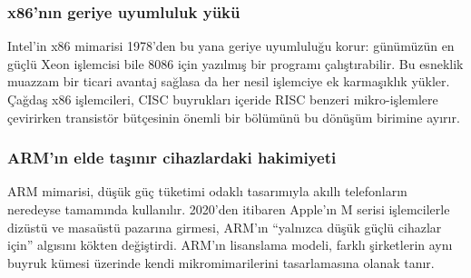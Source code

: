 \subsubsection*{x86'nın geriye uyumluluk yükü}
Intel'in x86 mimarisi 1978'den bu yana geriye uyumluluğu korur: günümüzün en güçlü Xeon işlemcisi bile 8086 için yazılmış bir programı çalıştırabilir. Bu esneklik muazzam bir ticari avantaj sağlasa da her nesil işlemciye ek karmaşıklık yükler. Çağdaş x86 işlemcileri, CISC buyrukları içeride RISC benzeri mikro-işlemlere çevirirken transistör bütçesinin önemli bir bölümünü bu dönüşüm birimine ayırır.

\subsubsection*{ARM'ın elde taşınır cihazlardaki hakimiyeti}
ARM mimarisi, düşük güç tüketimi odaklı tasarımıyla akıllı telefonların neredeyse tamamında kullanılır. 2020'den itibaren Apple'ın M serisi işlemcilerle dizüstü ve masaüstü pazarına girmesi, ARM'ın ``yalnızca düşük güçlü cihazlar için'' algısını kökten değiştirdi. ARM'ın lisanslama modeli, farklı şirketlerin aynı buyruk kümesi üzerinde kendi mikromimarilerini tasarlamasına olanak tanır.

